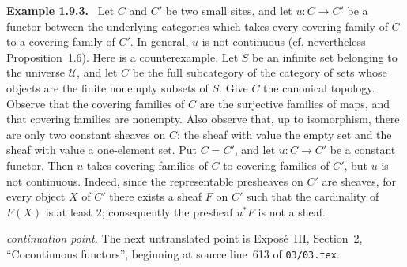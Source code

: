 \documentclass[11pt]{article}
\newcommand{\U}{\mathcal{U}}
\newenvironment{remarktext}[1]{\par\medskip\noindent\textbf{#1.}\ }{\par\medskip}
\begin{document}
\begin{remarktext}{Example 1.9.3}
Let \(C\) and \(C'\) be two small sites, and let \(u:C\to C'\) be a functor between the underlying categories which takes every covering family of \(C\) to a covering family of \(C'\). In general, \(u\) is not continuous (cf. nevertheless Proposition~1.6). Here is a counterexample. Let \(S\) be an infinite set belonging to the universe \(\U\), and let \(C\) be the full subcategory of the category of sets whose objects are the finite nonempty subsets of \(S\). Give \(C\) the canonical topology. Observe that the covering families of \(C\) are the surjective families of maps, and that covering families are nonempty. Also observe that, up to isomorphism, there are only two constant sheaves on \(C\): the sheaf with value the empty set and the sheaf with value a one-element set. Put \(C=C'\), and let \(u:C\to C'\) be a constant functor. Then \(u\) takes covering families of \(C\) to covering families of \(C'\), but \(u\) is not continuous. Indeed, since the representable presheaves on \(C'\) are sheaves, for every object \(X\) of \(C'\) there exists a sheaf \(F\) on \(C'\) such that the cardinality of \(F(X)\) is at least \(2\); consequently the presheaf \(u^*F\) is not a sheaf.
\end{remarktext}

\bigskip
\noindent\emph{continuation point.} The next untranslated point is Expos\'e~III, Section~2, ``Cocontinuous functors'', beginning at source line~613 of \texttt{03/03.tex}.
\end{document}
